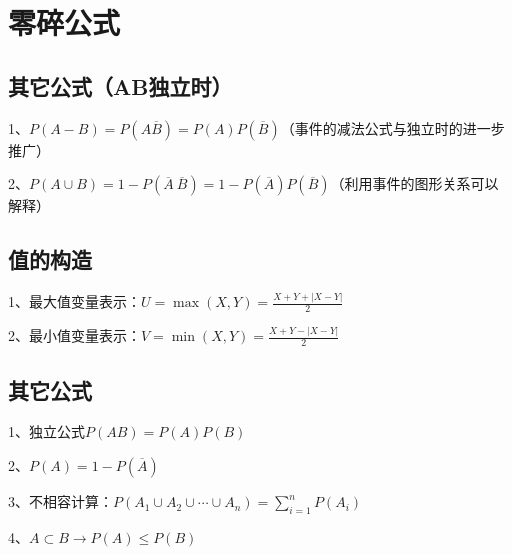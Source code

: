 \section{零碎公式}



\subsection{其它公式（AB独立时）}

1、$P(A-B) = P(A\overline B)=P(A)P(\overline B)$（事件的减法公式与独立时的进一步推广）

2、$P(A\cup B) = 1-P(\overline A \  \overline B) = 1-P(\overline A)P(  \overline B)$（利用事件的图形关系可以解释）



\subsection{值的构造}

1、最大值变量表示：$U=\max (X, Y)=\frac{X+Y+|X-Y|}{2}$



2、最小值变量表示：$V=\min (X, Y)=\frac{X+Y-|X-Y|}{2}$



\subsection{其它公式}

1、独立公式$P(AB)=P(A)P(B)$

2、$P(A)=1-P(\overline A)$

3、不相容计算：$P\left(A_{1} \cup A_{2} \cup \cdots \cup A_{n}\right)=\sum_{i=1}^{n} P\left(A_{i}\right)$

4、$A \subset B\rightarrow P(A) \leqslant P(B)$

